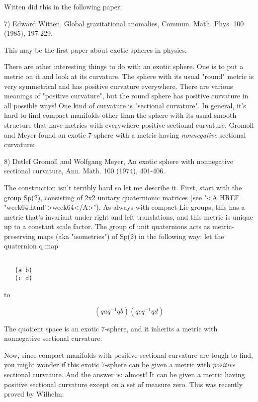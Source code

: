 Witten did this in the following paper:

7) Edward Witten, Global gravitational anomalies, Commun. Math. Phys.
100 (1985), 197-229.


This may be the first paper about exotic spheres in physics. 

There are other interesting things to do with an exotic sphere.  One is
to put a metric on it and look at its curvature.  The sphere with its
usual "round" metric is very symmetrical and has positive
curvature everywhere.  There are various meanings of "positive
curvature", but the round sphere has positive curvature in all
possible ways!  One kind of curvature is "sectional
curvature".  In general, it's hard to find compact manifolds other
than the sphere with its usual smooth structure that have metrics with
everywhere positive sectional curvature.  Gromoll and Meyer found an
exotic 7-sphere with a metric having \emph{nonnegative} sectional curvature:

8) Detlef Gromoll and Wolfgang Meyer, An exotic sphere with nonnegative 
sectional curvature, Ann. Math. 100 (1974), 401-406. 

The construction isn't terribly hard so let me describe it.  First,
start with the group Sp(2), consisting of 2x2 unitary quaternionic
matrices (see "<A HREF = "week64.html">week64</A>").  As
always with compact Lie groups, this has a metric that's invariant under
right and left translations, and this metric is unique up to a constant
scale factor.  The group of unit quaternions acts as metric-preserving
maps (aka "isometries") of Sp(2) in the following way: let the
quaternion q map

\begin{verbatim}

   (a b)  
   (c d)

\end{verbatim}
    
to 

$$

   (qaq^{-1}  qb)
   (qcq^{-1}  qd)
$$
    
The quotient space is an exotic 7-sphere, and it inherits a metric
with nonnegative sectional curvature.  

Now, since compact manifolds with positive sectional curvature are
tough to find, you might wonder if this exotic 7-sphere can be given 
a metric with \emph{positive} 
sectional curvature.  And the answer is: almost!
It can be given a metric having positive sectional curvature except on a
set of measure zero.  This was recently proved by Wilhelm:


